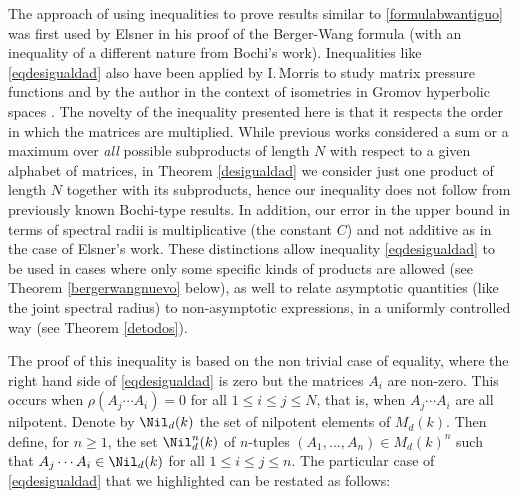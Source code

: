 The approach of using inequalities to prove results similar to \eqref{formulabwantiguo} was first used by Elsner \cite{elsner} in his proof of the Berger-Wang formula (with an inequality of a different nature from Bochi's work). Inequalities like \eqref{eqdesigualdad} also have been applied by I.\,Morris to study matrix pressure functions \cite{morrispr} and by the author in the context of isometries in Gromov hyperbolic spaces \cite{yo}. The novelty of the inequality presented here is that it respects the order in which the matrices are multiplied. While previous works considered a sum or a maximum over \textit{all} possible subproducts of length $N$ with respect to a given alphabet of matrices, in Theorem \ref{desigualdad} we consider just one product of length $N$ together with its subproducts, hence our inequality does not follow from previously known Bochi-type results. In addition, our error in the upper bound in terms of spectral radii is multiplicative (the constant $C$) and not additive as in the case of Elsner's work. These distinctions allow inequality \eqref{eqdesigualdad} to be used in cases where only some specific kinds of products are allowed (see Theorem \ref{bergerwangnuevo} below), as well to relate asymptotic quantities (like the joint spectral radius) to non-asymptotic expressions, in a uniformly controlled way (see Theorem \ref{detodos}).

The proof of this inequality is based on the non trivial case of equality, where the right hand side of \eqref{eqdesigualdad} is zero but the matrices $A_i$ are non-zero. This occurs when $\rho(A_{j}\cdots A_{i})=0$ for all $1\leq i \leq j \leq N$, that is, when $A_{j}\cdots A_{i}$ are all nilpotent. Denote by $\Nil_{d}(k)$ the set of nilpotent elements of $M_{d}(k)$. Then define, for $n\geq 1$, the set $\Nil_{d}^{n}(k)$ of $n$-tuples $(A_1,\dots,A_n)\in {M_{d}(k)}^{n}$ such that $A_{j}\cdots A_{i}\in \Nil_{d}(k)$ for all $1\leq i \leq j \leq n$.
The particular case of \eqref{eqdesigualdad} that we highlighted can be restated as follows:


